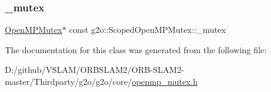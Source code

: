 \subsubsection{\texorpdfstring{\+\_\+mutex}{\_mutex}}
{\footnotesize\ttfamily \mbox{\hyperlink{classg2o_1_1_open_m_p_mutex}{Open\+M\+P\+Mutex}}$\ast$ const g2o\+::\+Scoped\+Open\+M\+P\+Mutex\+::\+\_\+mutex\hspace{0.3cm}{\ttfamily [private]}}



The documentation for this class was generated from the following file\+:\begin{DoxyCompactItemize}
\item 
D\+:/github/\+V\+S\+L\+A\+M/\+O\+R\+B\+S\+L\+A\+M2/\+O\+R\+B-\/\+S\+L\+A\+M2-\/master/\+Thirdparty/g2o/g2o/core/\mbox{\hyperlink{openmp__mutex_8h}{openmp\+\_\+mutex.\+h}}\end{DoxyCompactItemize}
